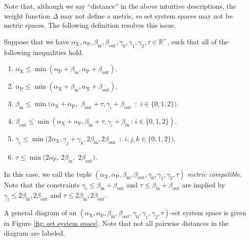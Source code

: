 \documentclass{theoretics}
\newcommand{\R}{\mathbb{R}}
\newcommand{\1}{\textbf{1}}
\newcommand{\td}{\tau}
\newcommand{\srd}{\alpha_{\text{X}}}
\newcommand{\trd}{\alpha_{\text{P}}}
\begin{document}
Note that, although we say ``distance'' in the above intuitive descriptions, the weight function $\Delta$ may not define a metric, so set system spaces may not be metric spaces. The following definition resolves this issue.

\begin{definition} \label{defn: metric compat}
 Suppose that we have $\srd, \trd, \beta_{\text{in}}, \beta_{\text{out}}, \gamma_0, \gamma_1, \gamma_2, \td \in \R^+$, such that all of the following inequalities hold.
\begin{enumerate}
    \item $\srd \leq \min(\trd + \beta_{\text{in}},\trd + \beta_{\text{out}})$.
    \item $\trd \leq \min(\srd + \beta_{\text{in}}, \srd + \beta_{\text{out}}).$
    \item $\beta_{\text{in}} \leq  \min(\srd + \trd,$ $\beta_{\text{out}} + \td, \gamma_i + \beta_{\text{out}}$ \,:\, $i \in \{0,1,2\})$.
    \item $\beta_{\text{out}} \leq \min(\srd + \trd, \beta_{\text{in}} + \td, \gamma_i + \beta_{\text{in}} \,:\, i \in \{0,1,2\})$.
    \item $\gamma_i \leq \min(2 \srd, \gamma_j + \gamma_k, 2\beta_{\text{in}}, 2\beta_{\text{out}}$ \,:\, $i,j,k \in \{0,1,2\})$.
    \item $\td \leq \min(2 \trd$, $2\beta_{\text{in}},$ $2\beta_{\text{out}})$.
\end{enumerate}
In this case, we call the tuple $(\srd, \trd, \beta_{\text{in}}, \beta_{\text{out}}, \gamma_0, \gamma_1, \gamma_2, \td)$ \textit{metric compatible}. Note that the constraints $\gamma_i \leq \beta_{\text{in}} + \beta_{\text{out}}$ and $\td \leq \beta_{\text{in}} + \beta_{\text{out}}$ are implied by $\gamma_i \leq 2\beta_{\text{in}},  2\beta_{\text{out}}$ and $\td \leq 2\beta_{\text{in}}, 2\beta_{\text{out}}$. 
\end{definition}

A general diagram of an $(\srd, \trd, \beta_{\text{in}}, \beta_{\text{out}}, \gamma_0, \gamma_1, \gamma_2, \td)$-set system space is given in Figure \ref{fig: set system space}. Note that not all pairwise distances in the diagram are labeled. 
\end{document}

